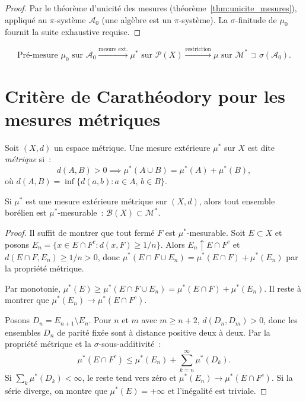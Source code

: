 \begin{proof}
Par le th\'eor\`eme d'unicit\'e des mesures (th\'eor\`eme~\ref{thm:unicite_mesures}),
appliqu\'e au $\pi$-syst\`eme $\mathcal{A}_0$ (une alg\`ebre est un $\pi$-syst\`eme).
La $\sigma$-finitude de $\mu_0$ fournit la suite exhaustive requise.
\end{proof}

\begin{formules}[title=\textbf{R\'esum\'e de la construction de Carath\'eodory}]
\[
\text{Pr\'e-mesure } \mu_0 \text{ sur } \mathcal{A}_0
\xrightarrow{\text{mesure ext.}} \mu^* \text{ sur } \mathcal{P}(X)
\xrightarrow{\text{restriction}} \mu \text{ sur } \mathcal{M}^*
\supset \sigma(\mathcal{A}_0).
\]
\end{formules}

\section{Crit\`ere de Carath\'eodory pour les mesures m\'etriques}

\begin{definition}
Soit $(X, d)$ un espace m\'etrique. Une mesure ext\'erieure $\mu^*$ sur $X$ est dite
\emph{m\'etrique} si~:
\[
d(A, B) > 0 \implies \mu^*(A \cup B) = \mu^*(A) + \mu^*(B),
\]
o\`u $d(A, B) = \inf\{d(a, b) : a \in A,\, b \in B\}$.
\end{definition}

\begin{theoreme}
Si $\mu^*$ est une mesure ext\'erieure m\'etrique sur $(X, d)$, alors tout ensemble
bor\'elien est $\mu^*$-mesurable~: $\mathcal{B}(X) \subset \mathcal{M}^*$.
\end{theoreme}

\begin{proof}
Il suffit de montrer que tout ferm\'e $F$ est $\mu^*$-mesurable. Soit $E \subset X$
et posons $E_n = \{x \in E \cap F^c : d(x, F) \geq 1/n\}$. Alors $E_n \uparrow
E \cap F^c$ et $d(E \cap F, E_n) \geq 1/n > 0$, donc
$\mu^*(E \cap F \cup E_n) = \mu^*(E \cap F) + \mu^*(E_n)$ par la propri\'et\'e
m\'etrique.

Par monotonie, $\mu^*(E) \geq \mu^*(E \cap F \cup E_n) = \mu^*(E \cap F) +
\mu^*(E_n)$. Il reste \`a montrer que $\mu^*(E_n) \to \mu^*(E \cap F^c)$.

Posons $D_n = E_{n+1} \setminus E_n$. Pour $n$ et $m$ avec $m \geq n + 2$,
$d(D_n, D_m) > 0$, donc les ensembles $D_n$ de parit\'e fix\'ee sont \`a distance
positive deux \`a deux. Par la propri\'et\'e m\'etrique et la $\sigma$-sous-additivit\'e~:
\[
\mu^*(E \cap F^c) \leq \mu^*(E_n) + \sum_{k=n}^{\infty} \mu^*(D_k).
\]
Si $\sum_k \mu^*(D_k) < \infty$, le reste tend vers z\'ero et
$\mu^*(E_n) \to \mu^*(E \cap F^c)$. Si la s\'erie diverge, on montre que
$\mu^*(E) = +\infty$ et l'in\'egalit\'e est triviale.
\end{proof}

